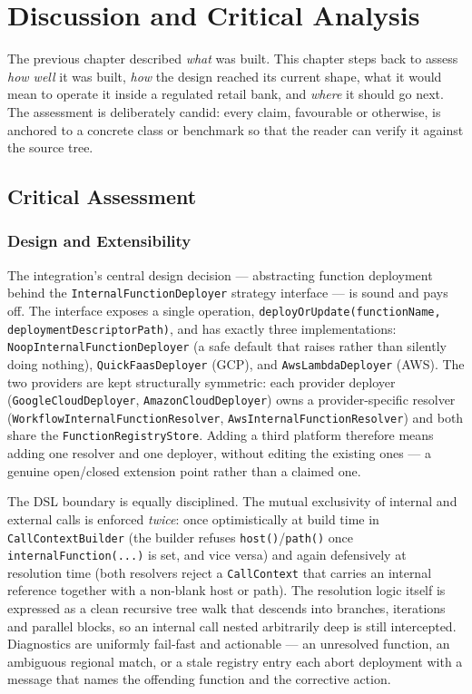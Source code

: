 %
%
%
\chapter{Discussion and Critical Analysis}
\label{cha:discussion}

The previous chapter described \emph{what} was built. This chapter steps back to assess
\emph{how well} it was built, \emph{how} the design reached its current shape, what it would
mean to operate it inside a regulated retail bank, and \emph{where} it should go next. The
assessment is deliberately candid: every claim, favourable or otherwise, is anchored to a
concrete class or benchmark so that the reader can verify it against the source tree.

\section{Critical Assessment}
\label{sec:critical-assessment}

\subsection{Design and Extensibility}

The integration's central design decision --- abstracting function deployment behind the
\texttt{InternalFunctionDeployer} strategy interface --- is sound and pays off. The interface
exposes a single operation, \texttt{deployOrUpdate(functionName, deploymentDescriptorPath)},
and has exactly three implementations: \texttt{NoopInternalFunctionDeployer} (a safe default
that raises rather than silently doing nothing), \texttt{QuickFaasDeployer} (GCP), and
\texttt{AwsLambdaDeployer} (AWS). The two providers are kept structurally symmetric: each
provider deployer (\texttt{GoogleCloudDeployer}, \texttt{AmazonCloudDeployer}) owns a
provider-specific resolver (\texttt{WorkflowInternalFunctionResolver},
\texttt{AwsInternalFunctionResolver}) and both share the \texttt{FunctionRegistryStore}. Adding
a third platform therefore means adding one resolver and one deployer, without editing the
existing ones --- a genuine open/closed extension point rather than a claimed one.

The DSL boundary is equally disciplined. The mutual exclusivity of internal and external calls
is enforced \emph{twice}: once optimistically at build time in \texttt{CallContextBuilder}
(the builder refuses \texttt{host()}/\texttt{path()} once \texttt{internalFunction(...)} is set,
and vice versa) and again defensively at resolution time (both resolvers reject a
\texttt{CallContext} that carries an internal reference together with a non-blank host or path).
The resolution logic itself is expressed as a clean recursive tree walk that descends into
branches, iterations and parallel blocks, so an internal call nested arbitrarily deep is still
intercepted. Diagnostics are uniformly fail-fast and actionable --- an unresolved function, an
ambiguous regional match, or a stale registry entry each abort deployment with a message that
names the offending function and the corrective action.

